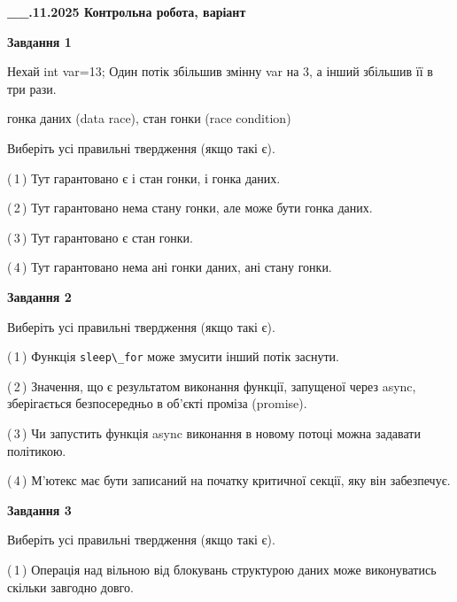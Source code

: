 \documentclass[12pt, ukrainian]{article}
\def\code#1{\Verb!#1!}
\begin{document}
\begin {large}

\textbf{\_\_.11.2025 Контрольна робота, варіант  }\par


{

\begin{center}
\textbf{Завдання 1}
\end{center}
Нехай int var=13; Один потік збільшив змінну var на 3, а інший збільшив її в три рази.

гонка даних (data race), стан гонки (race condition)

Виберіть усі правильні твердження (якщо такі є).\par
\vspace{2mm}
(\,1\,) Тут гарантовано є і стан гонки, і гонка даних.%

(\,2\,) Тут гарантовано нема стану гонки, але може бути гонка даних.%

(\,3\,) Тут гарантовано є стан гонки.%

(\,4\,) Тут гарантовано нема ані гонки даних, ані стану гонки.%



\begin{center}
\textbf{Завдання 2}
\end{center}
Виберіть усі правильні твердження (якщо такі є).\par
\vspace{2mm}

(\,1\,) Функція \code{sleep\_for} може змусити інший потік заснути.%

(\,2\,) Значення, що є результатом виконання функції, запущеної через async, зберігається безпосередньо в об’єкті проміза (promise).%

(\,3\,) Чи запустить функція  async виконання в новому потоці можна задавати політикою.%

(\,4\,) М’ютекс має бути записаний на початку критичної секції, яку він забезпечує.%



\begin{center}
\textbf{Завдання 3}
\end{center}
Виберіть усі правильні твердження (якщо такі є).\par
\vspace{2mm}

(\,1\,) Операція над вільною від блокувань структурою даних може виконуватись скільки завгодно довго.%

}
\end{large}
\end{document}
